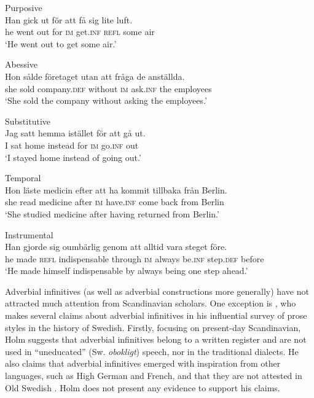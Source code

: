 \documentclass[output=paper]{langscibook}
\begin{document}
\ea
\label{ex:kalm:1}
\ea Purposive\label{ex:kalm:1a}\\
\gll Han gick ut för att få sig lite luft.\\
he went out for \textsc{im} get.\textsc{inf} \textsc{refl} some air\\
\glt ‘He went out to get some air.’

\ex Abessive\label{ex:kalm:1b}\\
\gll Hon sålde företaget utan att fråga de anställda.\\
she sold company.\textsc{def} without \textsc{im} ask.\textsc{inf} the employees\\
\glt ‘She sold the company without asking the employees.’

\ex Substitutive\label{ex:kalm:1c}\\
\gll Jag satt hemma istället för att gå ut.\\
I sat home instead for \textsc{im} go.\textsc{inf} out\\
\glt‘I stayed home instead of going out.’

\ex Temporal\label{ex:kalm:1d}\\
\gll Hon läste medicin efter att ha kommit tillbaka från Berlin.\\
she read medicine after \textsc{im} have.\textsc{inf} come back from Berlin\\
\glt ‘She studied medicine after having returned from Berlin.’

\ex Instrumental\label{ex:kalm:1e}\\
\gll Han gjorde sig oumbärlig genom att alltid vara steget före.\\
he made \textsc{refl} indispensable through \textsc{im} always be.\textsc{inf} step.\textsc{def} before\\
\glt ‘He made himself indispensable by always being one step ahead.’
\z
\z

Adverbial infinitives (as well as adverbial constructions more generally) have not attracted much attention from Scandinavian scholars. One exception is \citet{Holm1967}, who makes several claims about adverbial infinitives in his influential survey of prose styles in the history of Swedish. Firstly, focusing on present-day Scandinavian, Holm suggests that adverbial infinitives belong to a written register and are not used in “uneducated” (Sw. \textit{obokligt}) speech, nor in the traditional dialects. He also claims that adverbial infinitives emerged with inspiration from other languages, such as High German and French, and that they are not attested in Old Swedish \citep[27]{Holm1967}. Holm does not present any evidence to support his claims. 
\end{document}

